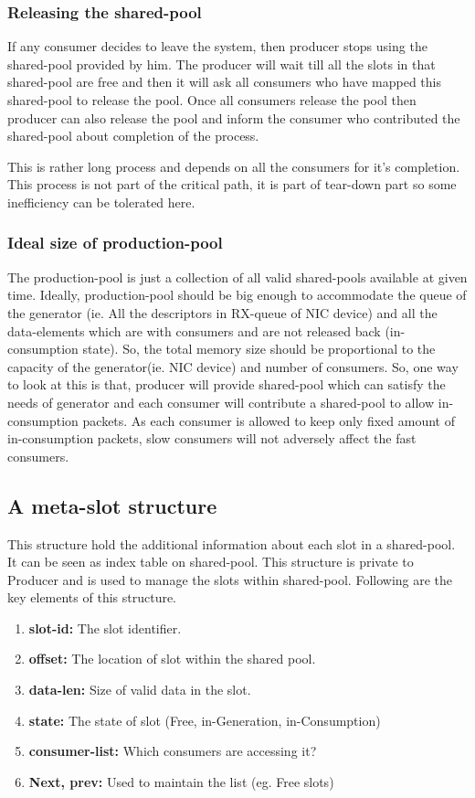 \documentclass[a4paper,twoside]{report} %
\begin{document}
\subsubsection{Releasing the shared-pool}
If any consumer decides to leave the system, then producer
stops using the shared-pool provided by him.  The producer will 
wait till all the slots in that shared-pool are free and then it will
ask all consumers who have mapped this shared-pool to release the
pool.  Once all consumers release the pool then producer can also
release the pool and inform the consumer who contributed the
shared-pool about completion of the process.

This is rather long process and depends on all the consumers for it's
completion.  This process is not part of the critical path, it is part
of tear-down part so some inefficiency can be tolerated here.




\subsubsection{Ideal size of production-pool}
The production-pool is just a collection of all valid shared-pools
available at given time.  Ideally, production-pool should be big enough 
to accommodate the queue of the generator (ie. All the descriptors 
in RX-queue of NIC device) and all the data-elements which are with 
consumers and are not released back (in-consumption state).  
So, the total memory size should be proportional to the capacity of 
the generator(ie. NIC device) and number of consumers.  
So, one way to look at this is that, producer will provide shared-pool
which can satisfy the needs of generator and each consumer will
contribute a shared-pool to allow in-consumption packets.
As each consumer is allowed to keep only fixed amount of 
in-consumption packets, slow consumers will not adversely 
affect the fast consumers.


\subsection{A meta-slot structure}
This structure hold the additional information about each slot in
a shared-pool.  It can be seen as index table on shared-pool.
This structure is private to Producer and is used to manage the
slots within shared-pool.  Following are the key elements of 
this structure.
\begin{enumerate} 
  \item \textbf{slot-id:} The slot identifier. 
  \item \textbf{offset:} The location of slot within the shared pool.
  \item \textbf{data-len:} Size of valid data in the slot.
  \item \textbf{state:} The state of slot (Free, in-Generation, 
  in-Consumption)
  \item \textbf{consumer-list:} Which consumers are accessing it? 
  \item \textbf{Next, prev:} Used to maintain the list (eg. Free slots)
\end{enumerate} 
\end{document}
